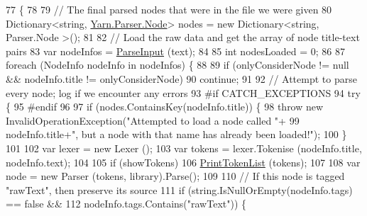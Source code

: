 \begin{DoxyCode}
77                                                                                                            
                                                            \{
78 
79             \textcolor{comment}{// The final parsed nodes that were in the file we were given}
80             Dictionary<string, \hyperlink{a00054}{Yarn.Parser.Node}> nodes = \textcolor{keyword}{new} Dictionary<string, Parser.Node
      >();
81 
82             \textcolor{comment}{// Load the raw data and get the array of node title-text pairs}
83             var nodeInfos = \hyperlink{a00051_a2f635405d2b624ac67a27da0787a3524}{ParseInput} (text);
84 
85             \textcolor{keywordtype}{int} nodesLoaded = 0;
86 
87             \textcolor{keywordflow}{foreach} (NodeInfo nodeInfo \textcolor{keywordflow}{in} nodeInfos) \{
88 
89                 \textcolor{keywordflow}{if} (onlyConsiderNode != null && nodeInfo.title != onlyConsiderNode)
90                     \textcolor{keywordflow}{continue};
91 
92                 \textcolor{comment}{// Attempt to parse every node; log if we encounter any errors}
93 \textcolor{preprocessor}{                #if CATCH\_EXCEPTIONS}
94 \textcolor{preprocessor}{}                \textcolor{keywordflow}{try} \{
95 \textcolor{preprocessor}{                #endif }
96 \textcolor{preprocessor}{}                    
97                     \textcolor{keywordflow}{if} (nodes.ContainsKey(nodeInfo.title)) \{
98                         \textcolor{keywordflow}{throw} \textcolor{keyword}{new} InvalidOperationException(\textcolor{stringliteral}{"Attempted to load a node called "}+
99                             nodeInfo.title+\textcolor{stringliteral}{", but a node with that name has already been loaded!"});
100                     \}
101 
102                     var lexer = \textcolor{keyword}{new} Lexer ();
103                     var tokens = lexer.Tokenise (nodeInfo.title, nodeInfo.text);
104 
105                     \textcolor{keywordflow}{if} (showTokens)
106                         \hyperlink{a00051_a9321fce224021841ce6f70ca7fbe531b}{PrintTokenList} (tokens);
107 
108                     var node = \textcolor{keyword}{new} Parser (tokens, library).Parse();
109 
110                     \textcolor{comment}{// If this node is tagged "rawText", then preserve its source}
111                     \textcolor{keywordflow}{if} (\textcolor{keywordtype}{string}.IsNullOrEmpty(nodeInfo.tags) == \textcolor{keyword}{false} && 
112                         nodeInfo.tags.Contains(\textcolor{stringliteral}{"rawText"})) \{

\end{DoxyCode}
